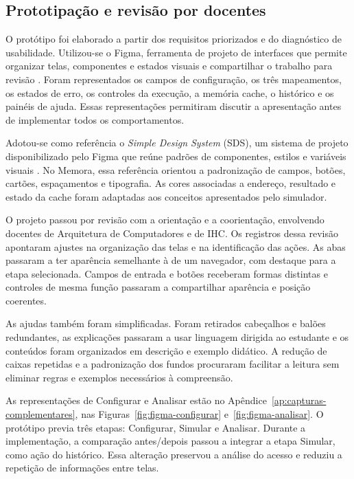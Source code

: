 \subsection{Prototipação e revisão por docentes}
\label{sec:prototipacao}

O protótipo foi elaborado a partir dos requisitos priorizados e do diagnóstico de usabilidade. Utilizou-se o Figma, ferramenta de projeto de interfaces que permite organizar telas, componentes e estados visuais e compartilhar o trabalho para revisão \cite{figmaDesign2026}. Foram representados os campos de configuração, os três mapeamentos, os estados de erro, os controles da execução, a memória cache, o histórico e os painéis de ajuda. Essas representações permitiram discutir a apresentação antes de implementar todos os comportamentos.

Adotou-se como referência o \textit{Simple Design System} (SDS), um sistema de projeto disponibilizado pelo Figma que reúne padrões de componentes, estilos e variáveis visuais \cite{figmaSds2026}. No Memora, essa referência orientou a padronização de campos, botões, cartões, espaçamentos e tipografia. As cores associadas a endereço, resultado e estado da cache foram adaptadas aos conceitos apresentados pelo simulador.

O projeto passou por revisão com a orientação e a coorientação, envolvendo docentes de Arquitetura de Computadores e de IHC. Os registros dessa revisão apontaram ajustes na organização das telas e na identificação das ações. As abas passaram a ter aparência semelhante à de um navegador, com destaque para a etapa selecionada. Campos de entrada e botões receberam formas distintas e controles de mesma função passaram a compartilhar aparência e posição coerentes.

As ajudas também foram simplificadas. Foram retirados cabeçalhos e balões redundantes, as explicações passaram a usar linguagem dirigida ao estudante e os conteúdos foram organizados em descrição e exemplo didático. A redução de caixas repetidas e a padronização dos fundos procuraram facilitar a leitura sem eliminar regras e exemplos necessários à compreensão.

As representações de Configurar e Analisar estão no Apêndice~\ref{ap:capturas-complementares}, nas Figuras~\ref{fig:figma-configurar} e~\ref{fig:figma-analisar}. O protótipo previa três etapas: Configurar, Simular e Analisar. Durante a implementação, a comparação antes/depois passou a integrar a etapa Simular, como ação do histórico. Essa alteração preservou a análise do acesso e reduziu a repetição de informações entre telas.
